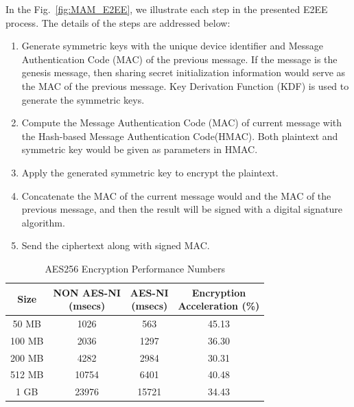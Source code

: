 \documentclass[conference]{IEEEtran}
\begin{document}
In the Fig.~\ref{fig:MAM_E2EE}, we illustrate each step in the presented E2EE process. The details of the steps are addressed below:

\begin{enumerate}
    \item Generate symmetric keys with the unique device identifier and Message Authentication Code (MAC) of the previous message. If the message is the genesis message, then sharing secret initialization information would serve as the MAC of the previous message. Key Derivation Function (KDF) is used to generate the symmetric keys.
    \item Compute the Message Authentication Code (MAC) of current message with the Hash-based Message Authentication Code(HMAC). Both plaintext and symmetric key would be given as parameters in HMAC.
    \item Apply the generated symmetric key to encrypt the plaintext.
    \item Concatenate the MAC of the current message would and the MAC of the previous message, and then the result will be signed with a digital signature algorithm.
    \item Send the ciphertext along with signed MAC.
\end{enumerate}

\begin{table}[htbp]
    \caption{AES256 Encryption Performance Numbers}
    \label{tab:AES_NI}
    \begin{center}
        \begin{tabular}{ |c||c|c|c|  }
            \hline
            Size& \makecell{NON AES-NI \\ (msecs)} & \makecell{AES-NI \\ (msecs)} & \makecell{Encryption \\ Acceleration (\%)} \\
            \hline
            50 MB  & 1026  & 563   & 45.13 \\
            100 MB & 2036  & 1297  & 36.30 \\
            200 MB & 4282  & 2984  & 30.31 \\
            512 MB & 10754 & 6401  & 40.48 \\
            1 GB   & 23976 & 15721 & 34.43 \\
            \hline
        \end{tabular}
    \end{center}
\end{table}
\end{document}
